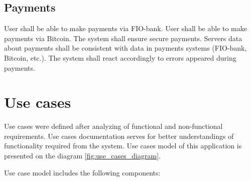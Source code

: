 \subsection*{Payments}
\begin{itemize}
User shall be able to make payments via FIO-bank.
User shall be able to make payments via Bitcoin.
The system shall ensure secure payments.
Servers data about payments shall be consistent with data in payments systems (FIO-bank, Bitcoin, etc.). The system shall react accordingly to errors appeared during payments.
\end{itemize}



\newcommand{\uccomponent}[1]{
\item \textbf{#1}
}
\newcommand{\ucactor}[1]{
\item \textbf{#1}
}
\newcommand{\ucgroup}[1]{
\item \textbf{#1}
}
\section{Use cases}
Use cases were defined after analyzing of functional and non-functional requirements. Use cases documentation serves for better understandings of functionality required from the system. Use cases model of this application is presented on the diagram \ref{fig:use_cases_diagram}.


Use case model includes the following components:

